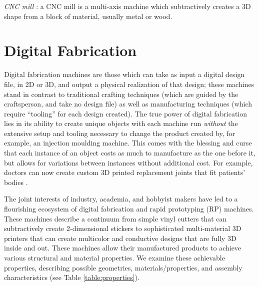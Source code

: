 \emph{CNC mill} : a CNC mill is a multi-axis machine which subtractively creates a 3D shape from a block of material, usually metal or wood.

\section{Digital Fabrication}

Digital fabrication machines are those which can take as input a digital design file, in 2D or 3D, and output a physical realization of that design; these machines stand in contrast to traditional crafting techniques (which are guided by the craftsperson, and take no design file) as well as manufacturing techniques (which require ``tooling'' for each design created). The true power of digital fabrication lies in its ability to create unique objects with each machine run \emph{without} the extensive setup and tooling necessary to change the product created by, for example, an injection moulding machine. This comes with the blessing and curse that each instance of an object costs as much to manufacture as the one before it, but allows for variations between instances without additional cost. For example, doctors can now create custom 3D printed replacement joints that fit patients' bodies \cite{findref}.

The joint interests of industry, academia, and hobbyist makers have led to a flourishing ecosystem of digital fabrication and rapid prototyping (RP) machines. These machines describe a continuum from simple vinyl cutters that can subtractively create 2-dimensional stickers to sophisticated multi-material 3D printers that can create multicolor and conductive designs that are fully 3D inside and out. These machines allow their manufactured products to achieve various structural and material properties. We examine these achievable properties, describing possible geometries, materials/properties, and assembly characteristics (see Table \ref{table:properties}).


